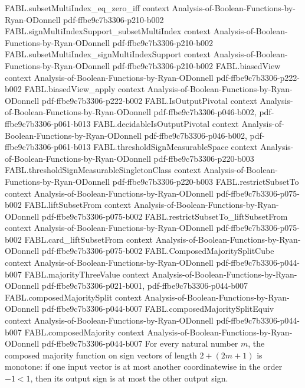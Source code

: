 \begin{theorem}
\proofstep
  {FABL.subsetMultiIndex_eq_zero_iff}
  {context}
  {Analysis-of-Boolean-Functions-by-Ryan-ODonnell}
  {pdf-ffbe9c7b3306-p210-b002}
\proofstep
  {FABL.signMultiIndexSupport_subsetMultiIndex}
  {context}
  {Analysis-of-Boolean-Functions-by-Ryan-ODonnell}
  {pdf-ffbe9c7b3306-p210-b002}
\proofstep
  {FABL.subsetMultiIndex_signMultiIndexSupport}
  {context}
  {Analysis-of-Boolean-Functions-by-Ryan-ODonnell}
  {pdf-ffbe9c7b3306-p210-b002}
\proofstep
  {FABL.biasedView}
  {context}
  {Analysis-of-Boolean-Functions-by-Ryan-ODonnell}
  {pdf-ffbe9c7b3306-p222-b002}
\proofstep
  {FABL.biasedView_apply}
  {context}
  {Analysis-of-Boolean-Functions-by-Ryan-ODonnell}
  {pdf-ffbe9c7b3306-p222-b002}
\proofstep
  {FABL.IsOutputPivotal}
  {context}
  {Analysis-of-Boolean-Functions-by-Ryan-ODonnell}
  {pdf-ffbe9c7b3306-p046-b002,
    pdf-ffbe9c7b3306-p061-b013}
\proofstep
  {FABL.decidableIsOutputPivotal}
  {context}
  {Analysis-of-Boolean-Functions-by-Ryan-ODonnell}
  {pdf-ffbe9c7b3306-p046-b002,
    pdf-ffbe9c7b3306-p061-b013}
\proofstep
  {FABL.thresholdSignMeasurableSpace}
  {context}
  {Analysis-of-Boolean-Functions-by-Ryan-ODonnell}
  {pdf-ffbe9c7b3306-p220-b003}
\proofstep
  {FABL.thresholdSignMeasurableSingletonClass}
  {context}
  {Analysis-of-Boolean-Functions-by-Ryan-ODonnell}
  {pdf-ffbe9c7b3306-p220-b003}
\proofstep
  {FABL.restrictSubsetTo}
  {context}
  {Analysis-of-Boolean-Functions-by-Ryan-ODonnell}
  {pdf-ffbe9c7b3306-p075-b002}
\proofstep
  {FABL.liftSubsetFrom}
  {context}
  {Analysis-of-Boolean-Functions-by-Ryan-ODonnell}
  {pdf-ffbe9c7b3306-p075-b002}
\proofstep
  {FABL.restrictSubsetTo_liftSubsetFrom}
  {context}
  {Analysis-of-Boolean-Functions-by-Ryan-ODonnell}
  {pdf-ffbe9c7b3306-p075-b002}
\proofstep
  {FABL.card_liftSubsetFrom}
  {context}
  {Analysis-of-Boolean-Functions-by-Ryan-ODonnell}
  {pdf-ffbe9c7b3306-p075-b002}
\proofstep
  {FABL.ComposedMajoritySplitCube}
  {context}
  {Analysis-of-Boolean-Functions-by-Ryan-ODonnell}
  {pdf-ffbe9c7b3306-p044-b007}
\proofstep
  {FABL.majorityThreeValue}
  {context}
  {Analysis-of-Boolean-Functions-by-Ryan-ODonnell}
  {pdf-ffbe9c7b3306-p021-b001,
    pdf-ffbe9c7b3306-p044-b007}
\proofstep
  {FABL.composedMajoritySplit}
  {context}
  {Analysis-of-Boolean-Functions-by-Ryan-ODonnell}
  {pdf-ffbe9c7b3306-p044-b007}
\proofstep
  {FABL.composedMajoritySplitEquiv}
  {context}
  {Analysis-of-Boolean-Functions-by-Ryan-ODonnell}
  {pdf-ffbe9c7b3306-p044-b007}
\proofstep
  {FABL.composedMajority}
  {context}
  {Analysis-of-Boolean-Functions-by-Ryan-ODonnell}
  {pdf-ffbe9c7b3306-p044-b007}
For every natural number $m$, the composed majority function on sign vectors of length
$2+(2m+1)$ is monotone: if one input vector is at most another coordinatewise in the
order $-1<1$, then its output sign is at most the other output sign.
\end{theorem}

